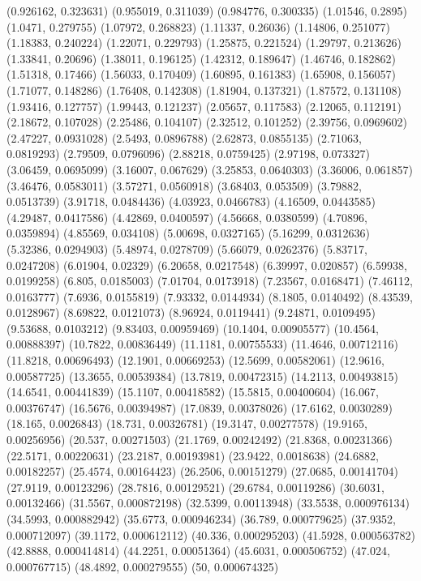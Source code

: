 {(0.926162, 0.323631)
(0.955019, 0.311039)
(0.984776, 0.300335)
(1.01546, 0.2895)
(1.0471, 0.279755)
(1.07972, 0.268823)
(1.11337, 0.26036)
(1.14806, 0.251077)
(1.18383, 0.240224)
(1.22071, 0.229793)
(1.25875, 0.221524)
(1.29797, 0.213626)
(1.33841, 0.20696)
(1.38011, 0.196125)
(1.42312, 0.189647)
(1.46746, 0.182862)
(1.51318, 0.17466)
(1.56033, 0.170409)
(1.60895, 0.161383)
(1.65908, 0.156057)
(1.71077, 0.148286)
(1.76408, 0.142308)
(1.81904, 0.137321)
(1.87572, 0.131108)
(1.93416, 0.127757)
(1.99443, 0.121237)
(2.05657, 0.117583)
(2.12065, 0.112191)
(2.18672, 0.107028)
(2.25486, 0.104107)
(2.32512, 0.101252)
(2.39756, 0.0969602)
(2.47227, 0.0931028)
(2.5493, 0.0896788)
(2.62873, 0.0855135)
(2.71063, 0.0819293)
(2.79509, 0.0796096)
(2.88218, 0.0759425)
(2.97198, 0.073327)
(3.06459, 0.0695099)
(3.16007, 0.067629)
(3.25853, 0.0640303)
(3.36006, 0.061857)
(3.46476, 0.0583011)
(3.57271, 0.0560918)
(3.68403, 0.053509)
(3.79882, 0.0513739)
(3.91718, 0.0484436)
(4.03923, 0.0466783)
(4.16509, 0.0443585)
(4.29487, 0.0417586)
(4.42869, 0.0400597)
(4.56668, 0.0380599)
(4.70896, 0.0359894)
(4.85569, 0.034108)
(5.00698, 0.0327165)
(5.16299, 0.0312636)
(5.32386, 0.0294903)
(5.48974, 0.0278709)
(5.66079, 0.0262376)
(5.83717, 0.0247208)
(6.01904, 0.02329)
(6.20658, 0.0217548)
(6.39997, 0.020857)
(6.59938, 0.0199258)
(6.805, 0.0185003)
(7.01704, 0.0173918)
(7.23567, 0.0168471)
(7.46112, 0.0163777)
(7.6936, 0.0155819)
(7.93332, 0.0144934)
(8.1805, 0.0140492)
(8.43539, 0.0128967)
(8.69822, 0.0121073)
(8.96924, 0.0119441)
(9.24871, 0.0109495)
(9.53688, 0.0103212)
(9.83403, 0.00959469)
(10.1404, 0.00905577)
(10.4564, 0.00888397)
(10.7822, 0.00836449)
(11.1181, 0.00755533)
(11.4646, 0.00712116)
(11.8218, 0.00696493)
(12.1901, 0.00669253)
(12.5699, 0.00582061)
(12.9616, 0.00587725)
(13.3655, 0.00539384)
(13.7819, 0.00472315)
(14.2113, 0.00493815)
(14.6541, 0.00441839)
(15.1107, 0.00418582)
(15.5815, 0.00400604)
(16.067, 0.00376747)
(16.5676, 0.00394987)
(17.0839, 0.00378026)
(17.6162, 0.0030289)
(18.165, 0.0026843)
(18.731, 0.00326781)
(19.3147, 0.00277578)
(19.9165, 0.00256956)
(20.537, 0.00271503)
(21.1769, 0.00242492)
(21.8368, 0.00231366)
(22.5171, 0.00220631)
(23.2187, 0.00193981)
(23.9422, 0.0018638)
(24.6882, 0.00182257)
(25.4574, 0.00164423)
(26.2506, 0.00151279)
(27.0685, 0.00141704)
(27.9119, 0.00123296)
(28.7816, 0.00129521)
(29.6784, 0.00119286)
(30.6031, 0.00132466)
(31.5567, 0.000872198)
(32.5399, 0.00113948)
(33.5538, 0.000976134)
(34.5993, 0.000882942)
(35.6773, 0.000946234)
(36.789, 0.000779625)
(37.9352, 0.000712097)
(39.1172, 0.000612112)
(40.336, 0.000295203)
(41.5928, 0.000563782)
(42.8888, 0.000414814)
(44.2251, 0.00051364)
(45.6031, 0.000506752)
(47.024, 0.000767715)
(48.4892, 0.000279555)
(50, 0.000674325)
}


